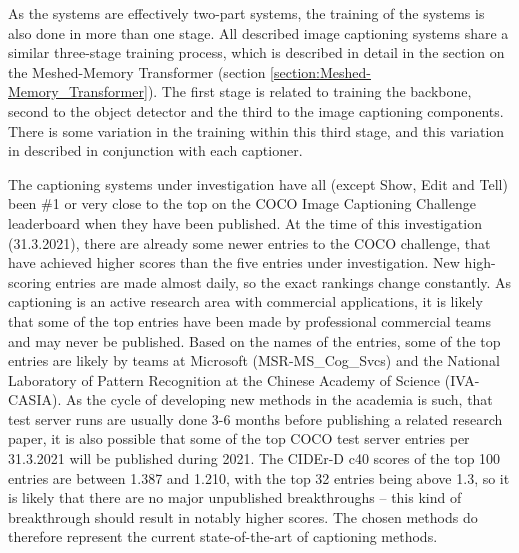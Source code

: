 \documentclass[english,twoside,openright]{HYgraduMLDS}
\begin{document}
As the systems are effectively two-part systems, the training of the systems is also done in more than one stage. All described image captioning systems share a similar three-stage training process, which is described in detail in the section on the Meshed-Memory Transformer (section \ref{section:Meshed-Memory_Transformer}). The first stage is related to training the backbone, second to the object detector and the third to the image captioning components. There is some variation in the training within this third stage, and this variation in described in conjunction with each captioner.

The captioning systems under investigation have all (except Show, Edit and Tell) been \#1 or very close to the top on the COCO Image Captioning Challenge leaderboard when they have been published. At the time of this investigation (31.3.2021), there are already some newer entries to the COCO challenge, that have achieved higher scores than the five entries under investigation. New high-scoring entries are made almost daily, so the exact rankings change constantly. As captioning is an active research area with commercial applications, it is likely that some of the top entries have been made by professional commercial teams and may never be published. Based on the names of the entries, some of the top entries are likely by teams at  Microsoft (MSR-MS\_Cog\_Svcs) and the National Laboratory of Pattern Recognition at the Chinese Academy of Science (IVA-CASIA). As the cycle of developing new methods in the academia is such, that test server runs are usually done 3-6 months before publishing a related research paper, it is also possible that some of the top COCO test server entries per 31.3.2021 will be published during 2021. The CIDEr-D c40 scores of the top 100 entries are between 1.387 and 1.210, with the top 32 entries being above 1.3, so it is likely that there are no major unpublished breakthroughs -- this kind of breakthrough should result in notably higher scores. The chosen methods do therefore represent the current state-of-the-art of captioning methods.
\end{document}
